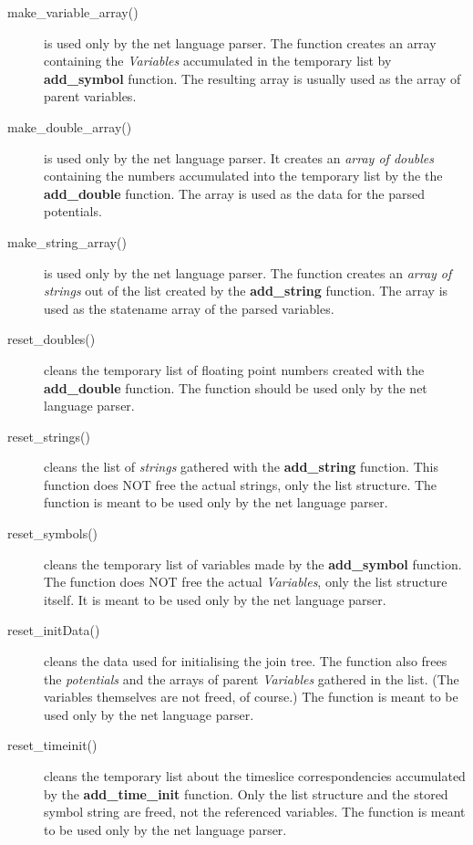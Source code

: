 \documentclass[12pt,a4paper]{report}
\begin{document}
\begin{description}
\item[make\_variable\_array()] is used only by the net language
parser. The function creates an array containing the {\it Variables}
accumulated in the temporary list by \textbf{add\_symbol}
function. The resulting array is usually used as the array of parent 
variables.

\item[make\_double\_array()] is used only by the net language
parser. It creates an {\it array of doubles} containing the numbers
accumulated into the temporary list by the the \textbf{add\_double}
function. The array is used as the data for the parsed potentials. 

\item[make\_string\_array()] is used only by the net language
parser. The function creates an {\it array of strings} out of the list
created by the \textbf{add\_string} function. The array is used as the
statename array of the parsed variables.

\item[reset\_doubles()] cleans the temporary list of floating point
numbers created with the \textbf{add\_double} function. The function
should be used only by the net language parser.

\item[reset\_strings()] cleans the list of {\it strings} gathered with
the \textbf{add\_string} function. This function does NOT free the
actual strings, only the list structure. The function is meant to be
used only by the net language parser.

\item[reset\_symbols()] cleans the temporary list of variables made by
the \textbf{add\_symbol} function. The function does NOT free the
actual {\it Variables}, only the list structure itself. It is meant to
be used only by the net language parser.

\item[reset\_initData()] cleans the data used for initialising the
join tree. The function also frees the {\it potentials} and the arrays of
parent {\it Variables} gathered in the list. (The variables themselves
are not freed, of course.) The function is meant to be used only by
the net language parser.

\item[reset\_timeinit()] cleans the temporary list about the timeslice
correspondencies accumulated by the \textbf{add\_time\_init} function.
Only the list structure and the stored symbol string are freed, not
the referenced variables. The function is meant to be used only by the
net language parser.


\end{description}
\end{document}
